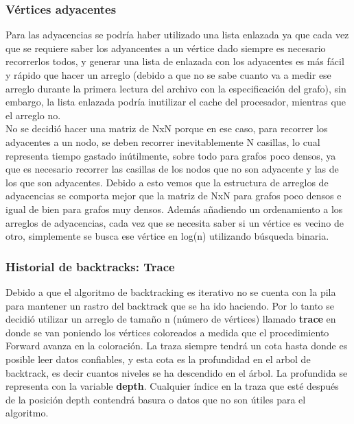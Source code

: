\documentclass[a4paper,10pt]{article}
\begin{document}
\subsubsection{Vértices adyacentes}

 Para las adyacencias se podr\'ia haber utilizado una lista enlazada ya
  que cada vez que se requiere saber los adyancentes a un vértice dado
  siempre es necesario recorrerlos todos, y generar una lista de
  enlazada con los adyacentes es m\'as f\'acil y r\'apido que hacer un
  arreglo (debido a que no se sabe cuanto va a medir
  ese arreglo durante la primera lectura del archivo con la
  especificaci\'on del grafo), sin embargo, la lista enlazada podr\'ia
  inutilizar el cache del procesador, mientras que el arreglo no.\\

  \indent No se decidi\'o hacer una matriz de NxN porque en ese caso, para recorrer los
  adyacentes a un nodo, se deben recorrer inevitablemente N casillas, lo
  cual representa tiempo gastado in\'utilmente, sobre todo para grafos
  poco densos, ya que es necesario recorrer las casillas de los nodos que
  no son adyacente y las de los que son adyacentes. Debido a esto vemos
  que la estructura de arreglos de adyacencias se comporta mejor que la
  matriz de NxN para grafos poco densos e igual de bien para grafos muy
  densos. Además añadiendo un ordenamiento a los arreglos de adyacencias, cada vez que 
se necesita saber si un vértice es vecino de otro, simplemente se busca ese vértice en log(n)
utilizando búsqueda binaria.

\subsubsection{Historial de backtracks: Trace}

Debido a que el algoritmo de backtracking es iterativo no se cuenta con la pila 
para mantener un rastro del backtrack que se ha ido haciendo. Por lo tanto se decidió
utilizar un arreglo de tamaño n (número de vértices) llamado \textbf{trace} en donde 
se van poniendo los vértices coloreados a medida que el procedimiento Forward avanza en
la coloración. La traza siempre tendrá un cota hasta donde es posible leer datos confiables, 
y esta cota es la profundidad en el arbol de backtrack, es decir cuantos niveles se ha descendido 
en el árbol. La profundida se representa con la variable \textbf{depth}. Cualquier índice en la 
traza que esté después de la posición depth contendrá basura o datos que no son útiles para el 
algoritmo. 
\end{document}
